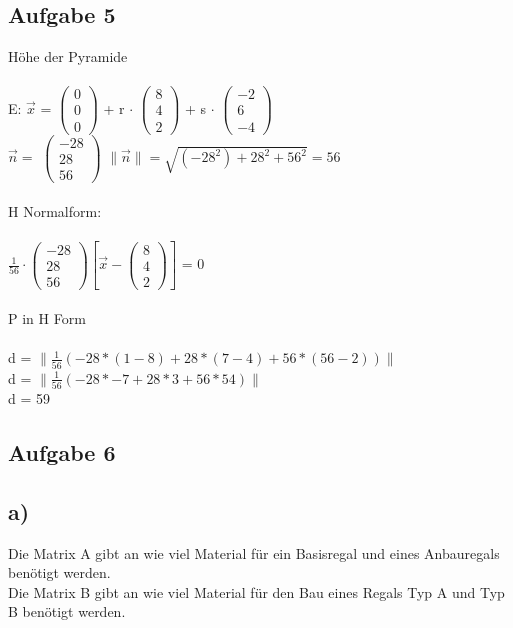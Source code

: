 \documentclass{article}
\begin{document}
	\subsection*{Aufgabe 5}
	Höhe der Pyramide \\ \\
	E: $\vec{x}$ =
	$\left(
	\begin{array}{c}
	 0\\0\\0 
	\end{array}
	\right)$
	+
	r $\cdot$
	$\left(
	\begin{array}{c}
	8\\4\\2 
	\end{array}
	\right)$
	+ s $\cdot$
	$\left(
	\begin{array}{c}
	-2\\6\\-4 
	\end{array}
	\right)$
	\\
	$\vec{n} =$ 
	$\left(
	\begin{array}{c}
	-28\\28\\56
	\end{array}
	\right)$
	$\|\vec{n}\| = \sqrt{(-28^2) + 28^2 + 56^2} = 56$ \\ \\
	H Normalform: \\ \\
	$\frac{1}{56} \cdot
	\left(
	\begin{array}{c}
	-28 \\ 28 \\ 56
	\end{array}	
	\right)  \left[\vec{x} - 
	\left(
	\begin{array}{c}
	 8\\4\\2
	\end{array}
	\right) \right]$
	= 0 \\ \\
	P in H Form \\
	\\
	d = $\| \frac{1}{56} (-28 * (1 - 8) + 28*(7-4) + 56*(56-2))  \|$ \\
	d = $\| \frac{1}{56} (-28 * -7  + 28*3 + 56*54)\|$ \\
	d = 59
	\subsection*{Aufgabe 6}
	\subsection*{a)}
	Die Matrix A gibt an wie viel Material für ein Basisregal und eines Anbauregals benötigt werden. \\
	Die Matrix B gibt an wie viel Material für den Bau eines Regals Typ A und Typ B benötigt werden. \\
\end{document}
